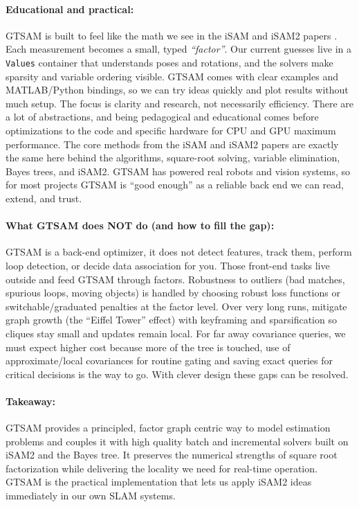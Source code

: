 \paragraph{Educational and practical:}
GTSAM is built to feel like the math we see in the iSAM and iSAM2 papers \cite{iSAM_paper,iSAM2_paper}. Each measurement becomes a small, typed \textit{``factor''}. Our current guesses live in a \texttt{Values} container that understands poses and rotations, and the solvers make sparsity and variable ordering visible. GTSAM comes with clear examples and MATLAB/Python bindings, so we can try ideas quickly and plot results without much setup. The focus is clarity and research, not necessarily efficiency. There are a lot of abstractions, and being pedagogical and educational comes before optimizations to the code and specific hardware for CPU and GPU maximum performance. The core methods from the iSAM and iSAM2 papers \cite{iSAM_paper,iSAM2_paper} are exactly the same here behind the algorithms, square-root solving, variable elimination, Bayes trees, and iSAM2. GTSAM has powered real robots and vision systems, so for most projects GTSAM is ``good enough'' as a reliable back end we can read, extend, and trust. \cite{GTSAM_handbook}

\paragraph{What GTSAM does NOT do (and how to fill the gap):}
GTSAM is a back-end optimizer, it does not detect features, track them, perform loop detection, or decide data association for you. Those front-end tasks live outside and feed GTSAM through factors. Robustness to outliers (bad matches, spurious loops, moving objects) is handled by choosing robust loss functions or switchable/graduated penalties at the factor level. Over very long runs, mitigate graph growth (the ``Eiffel Tower'' effect) with keyframing and sparsification so cliques stay small and updates remain local. For far away covariance queries, we must expect higher cost because more of the tree is touched, use of approximate/local covariances for routine gating and saving exact queries for critical decisions is the way to go. With clever design these gaps can be resolved. \cite{GTSAM_handbook}

\paragraph{Takeaway:}
GTSAM provides a principled, factor graph centric way to model estimation problems and couples it with high quality batch and incremental solvers built on iSAM2 and the Bayes tree. It preserves the numerical strengths of square root factorization while delivering the locality we need for real-time operation. GTSAM is the practical implementation that lets us apply iSAM2 ideas immediately in our own SLAM systems. \cite{GTSAM_handbook}

